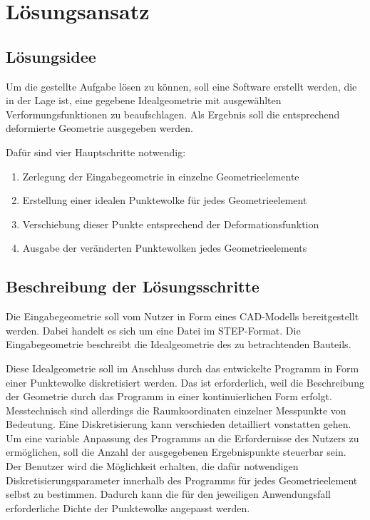 \section{Lösungsansatz}

\subsection{Lösungsidee}

Um die gestellte Aufgabe lösen zu können, soll eine Software erstellt werden, die in der Lage ist, eine gegebene Idealgeometrie mit ausgewählten Verformungsfunktionen zu beaufschlagen. Als Ergebnis soll die entsprechend deformierte Geometrie ausgegeben werden. 

Dafür sind vier Hauptschritte notwendig: 

\begin{enumerate}
	\item Zerlegung der Eingabegeometrie in einzelne Geometrieelemente
	\item Erstellung einer idealen Punktewolke für jedes Geometrieelement
	\item Verschiebung dieser Punkte entsprechend der Deformationsfunktion
	\item Ausgabe der veränderten Punktewolken jedes Geometrieelements 
\end{enumerate}

\subsection{Beschreibung der Lösungsschritte}

Die Eingabegeometrie soll vom Nutzer in Form eines CAD-Modells bereitgestellt werden. Dabei handelt es sich um eine Datei im STEP-Format. Die Eingabegeometrie beschreibt die Idealgeometrie des zu betrachtenden Bauteils.

Diese Idealgeometrie soll im Anschluss durch das entwickelte Programm in Form einer Punktewolke diskretisiert werden. Das ist erforderlich, weil die Beschreibung der Geometrie durch das Programm in einer kontinuierlichen Form erfolgt. Messtechnisch sind allerdings die Raumkoordinaten einzelner Messpunkte von Bedeutung. Eine Diskretisierung kann verschieden detailliert vonstatten gehen. Um eine variable Anpassung des Programms an die Erfordernisse des Nutzers zu ermöglichen, soll die Anzahl der ausgegebenen Ergebnispunkte steuerbar sein. Der Benutzer wird die Möglichkeit erhalten, die dafür notwendigen Diskretisierungsparameter innerhalb des Programms für jedes Geometrieelement selbst zu bestimmen. Dadurch kann die für den jeweiligen Anwendungsfall erforderliche Dichte der Punktewolke angepasst werden.

